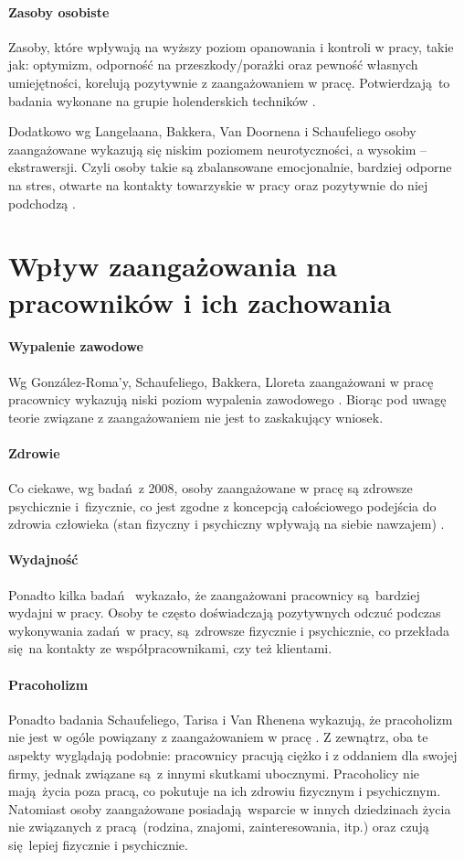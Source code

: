 \paragraph{Zasoby osobiste}
Zasoby, które wpływają na wyższy poziom opanowania i kontroli w pracy, takie jak: optymizm, odporność na przeszkody/porażki oraz pewność własnych umiejętności, korelują pozytywnie z zaangażowaniem w pracę. Potwierdzają to badania wykonane na grupie holenderskich techników \cite{xanthopoulou2007role}.

Dodatkowo wg Langelaana, Bakkera, Van Doornena i Schaufeliego osoby zaangażowane wykazują się niskim poziomem neurotyczności, a wysokim -- ekstrawersji. Czyli osoby takie są zbalansowane emocjonalnie, bardziej odporne na stres, otwarte na kontakty towarzyskie w pracy oraz pozytywnie do niej podchodzą \cite{langelaan2006burnout}. 

\section{Wpływ zaangażowania na pracowników i ich zachowania}
\label{sec:thoery-eng-infl2}
\paragraph{Wypalenie zawodowe}
Wg González-Roma'y, Schaufeliego, Bakkera, Lloreta zaangażowani w pracę pracownicy wykazują niski poziom wypalenia zawodowego \cite{gonzlez2006burnout}. Biorąc pod uwagę teorie związane z zaangażowaniem nie jest to zaskakujący wniosek.
\paragraph{Zdrowie}
Co ciekawe, wg badań z 2008, osoby zaangażowane w pracę są zdrowsze psychicznie i~fizycznie, co jest zgodne z koncepcją całościowego podejścia do zdrowia człowieka (stan fizyczny i psychiczny wpływają na siebie nawzajem) \cite{schaufeli2008workaholism}.
\paragraph{Wydajność}
Ponadto kilka badań \cite{xanthopoulou2008working,xanthopoulou2009work} wykazało, że zaangażowani pracownicy są~bardziej wydajni w pracy. Osoby te często doświadczają pozytywnych odczuć podczas wykonywania zadań w pracy, są zdrowsze fizycznie i psychicznie, co przekłada się na kontakty ze współpracownikami, czy też klientami.
\paragraph{Pracoholizm}
Ponadto badania Schaufeliego, Tarisa i Van Rhenena wykazują, że pracoholizm nie jest w ogóle powiązany z zaangażowaniem w pracę \cite{schaufeli2008workaholism}. Z zewnątrz, oba te aspekty wyglądają podobnie: pracownicy pracują ciężko i z oddaniem dla swojej firmy, jednak związane są z innymi skutkami ubocznymi. Pracoholicy nie mają życia poza pracą, co pokutuje na ich zdrowiu fizycznym i psychicznym. Natomiast osoby zaangażowane posiadają wsparcie w innych dziedzinach życia nie związanych z pracą (rodzina,
znajomi, zainteresowania, itp.) oraz czują się lepiej fizycznie i psychicznie.
